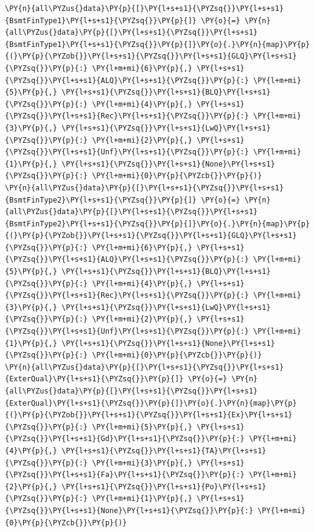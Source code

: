 \documentclass[no-math]{YangThesis}
\begin{document}
\begin{tcolorbox}[breakable, size=fbox, boxrule=1pt, pad at break*=1mm,colback=cellbackground, colframe=cellborder]
\begin{Verbatim}[commandchars=\\\{\}]
\PY{n}{all\PYZus{}data}\PY{p}{[}\PY{l+s+s1}{\PYZsq{}}\PY{l+s+s1}{BsmtFinType1}\PY{l+s+s1}{\PYZsq{}}\PY{p}{]} \PY{o}{=} \PY{n}{all\PYZus{}data}\PY{p}{[}\PY{l+s+s1}{\PYZsq{}}\PY{l+s+s1}{BsmtFinType1}\PY{l+s+s1}{\PYZsq{}}\PY{p}{]}\PY{o}{.}\PY{n}{map}\PY{p}{(}\PY{p}{\PYZob{}}\PY{l+s+s1}{\PYZsq{}}\PY{l+s+s1}{GLQ}\PY{l+s+s1}{\PYZsq{}}\PY{p}{:} \PY{l+m+mi}{6}\PY{p}{,} \PY{l+s+s1}{\PYZsq{}}\PY{l+s+s1}{ALQ}\PY{l+s+s1}{\PYZsq{}}\PY{p}{:} \PY{l+m+mi}{5}\PY{p}{,} \PY{l+s+s1}{\PYZsq{}}\PY{l+s+s1}{BLQ}\PY{l+s+s1}{\PYZsq{}}\PY{p}{:} \PY{l+m+mi}{4}\PY{p}{,} \PY{l+s+s1}{\PYZsq{}}\PY{l+s+s1}{Rec}\PY{l+s+s1}{\PYZsq{}}\PY{p}{:} \PY{l+m+mi}{3}\PY{p}{,} \PY{l+s+s1}{\PYZsq{}}\PY{l+s+s1}{LwQ}\PY{l+s+s1}{\PYZsq{}}\PY{p}{:} \PY{l+m+mi}{2}\PY{p}{,} \PY{l+s+s1}{\PYZsq{}}\PY{l+s+s1}{Unf}\PY{l+s+s1}{\PYZsq{}}\PY{p}{:} \PY{l+m+mi}{1}\PY{p}{,} \PY{l+s+s1}{\PYZsq{}}\PY{l+s+s1}{None}\PY{l+s+s1}{\PYZsq{}}\PY{p}{:} \PY{l+m+mi}{0}\PY{p}{\PYZcb{}}\PY{p}{)}
\PY{n}{all\PYZus{}data}\PY{p}{[}\PY{l+s+s1}{\PYZsq{}}\PY{l+s+s1}{BsmtFinType2}\PY{l+s+s1}{\PYZsq{}}\PY{p}{]} \PY{o}{=} \PY{n}{all\PYZus{}data}\PY{p}{[}\PY{l+s+s1}{\PYZsq{}}\PY{l+s+s1}{BsmtFinType2}\PY{l+s+s1}{\PYZsq{}}\PY{p}{]}\PY{o}{.}\PY{n}{map}\PY{p}{(}\PY{p}{\PYZob{}}\PY{l+s+s1}{\PYZsq{}}\PY{l+s+s1}{GLQ}\PY{l+s+s1}{\PYZsq{}}\PY{p}{:} \PY{l+m+mi}{6}\PY{p}{,} \PY{l+s+s1}{\PYZsq{}}\PY{l+s+s1}{ALQ}\PY{l+s+s1}{\PYZsq{}}\PY{p}{:} \PY{l+m+mi}{5}\PY{p}{,} \PY{l+s+s1}{\PYZsq{}}\PY{l+s+s1}{BLQ}\PY{l+s+s1}{\PYZsq{}}\PY{p}{:} \PY{l+m+mi}{4}\PY{p}{,} \PY{l+s+s1}{\PYZsq{}}\PY{l+s+s1}{Rec}\PY{l+s+s1}{\PYZsq{}}\PY{p}{:} \PY{l+m+mi}{3}\PY{p}{,} \PY{l+s+s1}{\PYZsq{}}\PY{l+s+s1}{LwQ}\PY{l+s+s1}{\PYZsq{}}\PY{p}{:} \PY{l+m+mi}{2}\PY{p}{,} \PY{l+s+s1}{\PYZsq{}}\PY{l+s+s1}{Unf}\PY{l+s+s1}{\PYZsq{}}\PY{p}{:} \PY{l+m+mi}{1}\PY{p}{,} \PY{l+s+s1}{\PYZsq{}}\PY{l+s+s1}{None}\PY{l+s+s1}{\PYZsq{}}\PY{p}{:} \PY{l+m+mi}{0}\PY{p}{\PYZcb{}}\PY{p}{)}
\PY{n}{all\PYZus{}data}\PY{p}{[}\PY{l+s+s1}{\PYZsq{}}\PY{l+s+s1}{ExterQual}\PY{l+s+s1}{\PYZsq{}}\PY{p}{]} \PY{o}{=} \PY{n}{all\PYZus{}data}\PY{p}{[}\PY{l+s+s1}{\PYZsq{}}\PY{l+s+s1}{ExterQual}\PY{l+s+s1}{\PYZsq{}}\PY{p}{]}\PY{o}{.}\PY{n}{map}\PY{p}{(}\PY{p}{\PYZob{}}\PY{l+s+s1}{\PYZsq{}}\PY{l+s+s1}{Ex}\PY{l+s+s1}{\PYZsq{}}\PY{p}{:} \PY{l+m+mi}{5}\PY{p}{,} \PY{l+s+s1}{\PYZsq{}}\PY{l+s+s1}{Gd}\PY{l+s+s1}{\PYZsq{}}\PY{p}{:} \PY{l+m+mi}{4}\PY{p}{,} \PY{l+s+s1}{\PYZsq{}}\PY{l+s+s1}{TA}\PY{l+s+s1}{\PYZsq{}}\PY{p}{:} \PY{l+m+mi}{3}\PY{p}{,} \PY{l+s+s1}{\PYZsq{}}\PY{l+s+s1}{Fa}\PY{l+s+s1}{\PYZsq{}}\PY{p}{:} \PY{l+m+mi}{2}\PY{p}{,} \PY{l+s+s1}{\PYZsq{}}\PY{l+s+s1}{Po}\PY{l+s+s1}{\PYZsq{}}\PY{p}{:} \PY{l+m+mi}{1}\PY{p}{,} \PY{l+s+s1}{\PYZsq{}}\PY{l+s+s1}{None}\PY{l+s+s1}{\PYZsq{}}\PY{p}{:} \PY{l+m+mi}{0}\PY{p}{\PYZcb{}}\PY{p}{)}

\end{Verbatim}
\end{tcolorbox}
\end{document}
